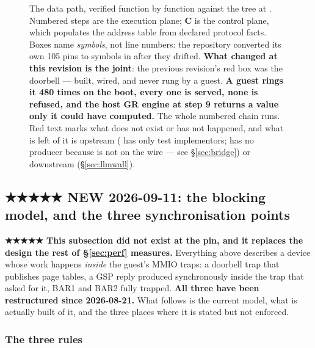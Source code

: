 \documentclass[10.5pt]{article}
\begin{document}
\begin{landscape}\begin{figure}[p]
\centering
{}
\caption{The data path, verified function by function against the tree at .
Numbered steps are the execution plane; \textbf{C} is the control plane, which populates the
address table from declared protocol facts. Boxes name \emph{symbols}, not line numbers: the
repository converted its own 105 pins to symbols in  after they drifted.
\textbf{What changed at this revision is the joint}: the previous revision's red box was the
doorbell — built, wired, and never rung by a guest. \textbf{A guest rings it 480 times on the
 boot, every one is served, none is refused, and the host GR engine at step 9 returns
a value only it could have computed.} The whole numbered chain runs. Red text marks what does not
exist or has not happened, and what is left of it is upstream ( has only test
implementors;  has no producer because  is not on
the wire — see \S\ref{sec:bridge}) or downstream (\S\ref{sec:llmwall}).}
\label{fig:datapath}
\end{figure}\end{landscape}

\subsection{\texorpdfstring{★★★★★ NEW 2026-09-11: the blocking model, and the three synchronisation points}{NEW 2026-09-11: the blocking model, and the three synchronisation points}}
\label{sec:blocking}

\begin{warnbox}\small
\textbf{★★★★★ This subsection did not exist at the pin, and it replaces the design the rest of
\S\ref{sec:perf} measures.} Everything above describes a device whose work happens \emph{inside}
the guest's MMIO traps: a doorbell trap that publishes page tables, a GSP reply produced
synchronously inside the trap that asked for it, BAR1 and BAR2 fully trapped. \textbf{All three
have been restructured since 2026-08-21.} What follows is the current model, what is actually
built of it, and the three places where it is stated but not enforced.
\end{warnbox}

\subsubsection*{The three rules}
\end{document}
